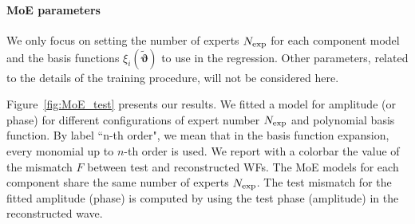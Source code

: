 \documentclass[twocolumn,showpacs,preprintnumbers,nofootinbib,prd,
superscriptaddress,10pt]{revtex4-1}
\begin{document}
\paragraph{MoE parameters}
We only focus on setting the number of experts $N_{\rm exp}$ for each component model and the basis functions $\xi_i(\boldsymbol{\tilde{\vartheta}})$ to use in the regression. Other parameters, related to the details of the training procedure, will not be considered here.

Figure~\ref{fig:MoE_test} presents our results.
We fitted a model for amplitude (or phase) for different configurations of expert number $N_{\rm exp}$ and polynomial basis function.
By label ``n-th order", we mean that in the basis function expansion, every monomial up to $n$-th order is used.
We report with a colorbar the value of the mismatch $F$ between test and reconstructed WFs. The MoE models for each 
component share the same number of experts $N_{\rm exp}$.
The test mismatch for the fitted amplitude (phase) is computed by using the test phase (amplitude) in the reconstructed wave.
\end{document}
